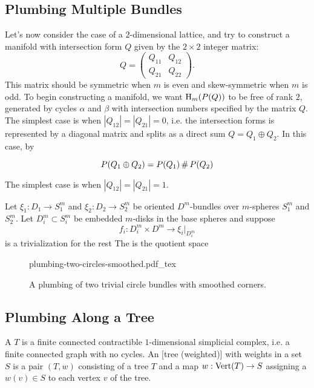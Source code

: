 \subsection*{Plumbing Multiple Bundles}

Let's now consider the case of a $2$-dimensional lattice, and try to construct a manifold with intersection form $Q$ given by the $2\times 2$ integer matrix:
\[
	Q = \begin{pmatrix} Q_{11} & Q_{12} \\ Q_{21} & Q_{22}\end{pmatrix}.
\]
This matrix should be symmetric when $m$ is even and skew-symmetric when $m$ is odd. To begin constructing a manifold, we want $\operatorname{H}_m(P(Q))$ to be free of rank $2$, generated by cycles $\alpha$ and $\beta$ with intersection numbers specified by the matrix $Q$. The simplest case is when $|Q_{12}|=|Q_{21}|=0$, i.e. the intersection forms is represented by a diagonal matrix and splits as a direct sum $Q=Q_1\oplus Q_2$. In this case, by

\[
	P(Q_1\oplus Q_2) = P(Q_1)\,\#\, P(Q_2)
\]

The simplest case is when $|Q_{12}|=|Q_{21}|=1$.


\begin{definition}
	Let $\xi_1 : D_1 \to S^m_1$ and $\xi_2 : D_2 \to S^m_2$ be oriented $D^m$-bundles over $m$-spheres $S^m_1$ and $S^m_2$. Let $D^m_i \subset S^m_i$ be embedded $m$-disks in the base spheres and suppose
	\[f_i : D_i^m\times D^m \to \xi_i|_{D_i^m}\]
	is a trivialization for the rest 
	The  is the quotient space
\end{definition}

\begin{remark}
\end{remark}

\begin{figure}[ht]\label{fig:plumbing-two-circles}
	\centering
	{plumbing-two-circles-smoothed.pdf_tex}
	\caption{A plumbing of two trivial circle bundles with smoothed corners.}
\end{figure}

\subsection*{Plumbing Along a Tree}

\begin{definition}
	A  $T$ is a finite connected contractible $1$-dimensional simplicial complex, i.e. a finite connected graph with no cycles. An [tree (weighted)] with weights in a set $S$ is a pair $(T,w)$ consisting of a tree $T$ and a map $w : {\operatorname{Vert}}(T) \to S$ assigning a  $w(v)\in S$ to each vertex $v$ of the tree.
\end{definition}

